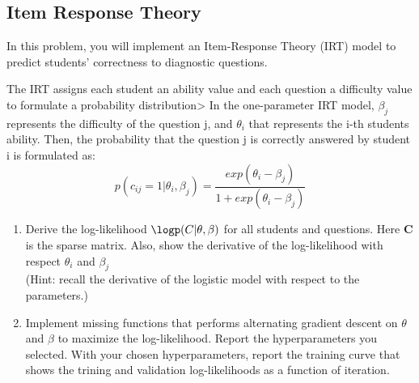 \newpage
\subsection*{Item Response Theory}
In this problem, you will implement an Item-Response Theory (IRT) model to predict students' correctness to diagnostic questions.

The IRT assigns each student an ability value and each question a difficulty value to formulate a probability distribution> In the one-parameter IRT model, $\beta_j$ represents the difficulty of the question j, and $\theta_i$ that represents the i-th students ability. Then, the probability that the question j is correctly answered by student i is formulated as:
\begin{equation*}
	p(c_{ij} = 1 | \theta_{i}, \beta_{j}) = \frac{exp(\theta_i - \beta_j)}{1 + exp(\theta_i -\beta_j)}
\end{equation*}
\begin{enumerate}
	\item Derive the log-likelihood $\logp(C|\theta, \beta)$ for all students and questions. Here \textbf{C} is the sparse matrix. Also, show the derivative of the log-likelihood with respect $\theta_i$ and $\beta_j$\\(Hint: recall the derivative of the logistic model with respect to the parameters.) 
	\item Implement missing functions that performs alternating gradient descent on $\theta$ and $\beta$ to maximize the log-likelihood. Report the hyperparameters you selected. With your chosen hyperparameters, report the training curve that shows the trining and validation log-likelihoods as a function of iteration.
\end{enumerate}
